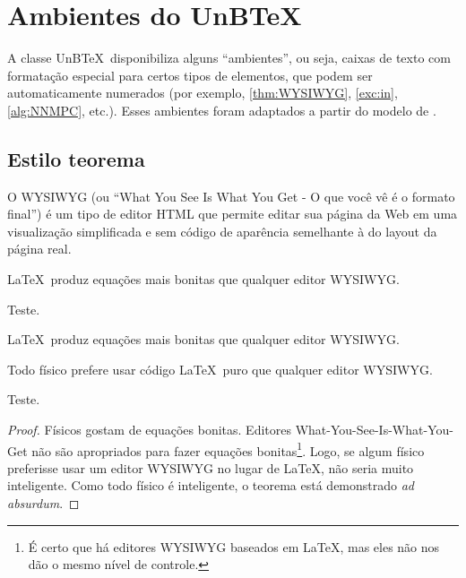 \chapter{Ambientes do UnB\TeX}

A classe UnB\TeX\ disponibiliza alguns ``ambientes'', ou seja, caixas de texto com formatação especial para certos tipos de elementos, que podem ser automaticamente numerados (por exemplo, \cref{thm:WYSIWYG}, \cref{exc:in}, \cref{alg:NNMPC}, etc.). Esses ambientes foram adaptados a partir do modelo de .

\section{Estilo teorema}

\begin{definition}
O WYSIWYG (ou ``What You See Is What You Get - O que você vê é o formato final'') é um tipo de editor HTML que permite editar sua página da Web em uma visualização simplificada e sem código de aparência semelhante à do layout da página real.
\end{definition}

\begin{proposition}\label{prop:WYSIWYG}
    \LaTeX\ produz equações mais bonitas que qualquer editor WYSIWYG.
\end{proposition}

\begin{lemma}
    Teste.
\end{lemma}

\begin{remark}
    \LaTeX\ produz equações mais bonitas que qualquer editor WYSIWYG.
\end{remark}

\begin{theorem}\label{thm:WYSIWYG}
    Todo físico prefere usar código \LaTeX\ puro que qualquer editor WYSIWYG.
\end{theorem}

\begin{corollary}
    Teste.
\end{corollary}

\begin{proof}
    Físicos gostam de equações bonitas. Editores What-You-See-Is-What-You-Get não são apropriados para fazer equações bonitas\footnote{É certo que há editores WYSIWYG baseados em \LaTeX, mas eles não nos dão o mesmo nível de controle.}. Logo, se algum físico preferisse usar um editor WYSIWYG no lugar de \LaTeX, não seria muito inteligente. Como todo físico é inteligente, o teorema está demonstrado \textit{ad absurdum}.
\end{proof}

